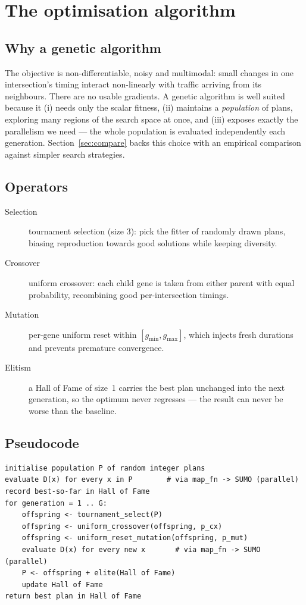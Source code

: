 \documentclass[11pt,a4paper]{article}
\begin{document}
\section{The optimisation algorithm}
\subsection{Why a genetic algorithm}
The objective is non-differentiable, noisy and multimodal: small changes in one
intersection's timing interact non-linearly with traffic arriving from its
neighbours. There are no usable gradients. A genetic algorithm is well suited
because it (i) needs only the scalar fitness, (ii) maintains a \emph{population}
of plans, exploring many regions of the search space at once, and (iii) exposes
exactly the parallelism we need --- the whole population is evaluated
independently each generation. Section~\ref{sec:compare} backs this choice with
an empirical comparison against simpler search strategies.

\subsection{Operators}
\begin{description}
  \item[Selection] tournament selection (size 3): pick the fitter of randomly
  drawn plans, biasing reproduction towards good solutions while keeping
  diversity.
  \item[Crossover] uniform crossover: each child gene is taken from either
  parent with equal probability, recombining good per-intersection timings.
  \item[Mutation] per-gene uniform reset within $[g_{\min},g_{\max}]$, which
  injects fresh durations and prevents premature convergence.
  \item[Elitism] a Hall of Fame of size~1 carries the best plan unchanged into
  the next generation, so the optimum never regresses --- the result can never
  be worse than the baseline.
\end{description}

\subsection{Pseudocode}
\noindent\hrulefill
\begin{verbatim}
initialise population P of random integer plans
evaluate D(x) for every x in P        # via map_fn -> SUMO (parallel)
record best-so-far in Hall of Fame
for generation = 1 .. G:
    offspring <- tournament_select(P)
    offspring <- uniform_crossover(offspring, p_cx)
    offspring <- uniform_reset_mutation(offspring, p_mut)
    evaluate D(x) for every new x       # via map_fn -> SUMO (parallel)
    P <- offspring + elite(Hall of Fame)
    update Hall of Fame
return best plan in Hall of Fame
\end{verbatim}
\noindent\hrulefill
\end{document}
